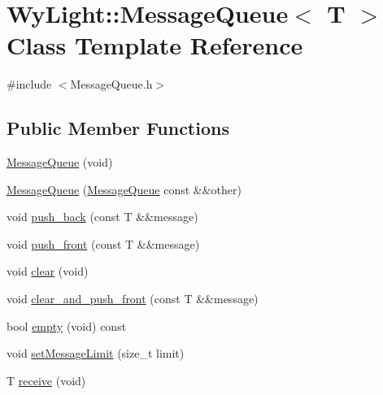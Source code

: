 \hypertarget{class_wy_light_1_1_message_queue}{\section{Wy\-Light\-:\-:Message\-Queue$<$ T $>$ Class Template Reference}
\label{class_wy_light_1_1_message_queue}
}


{\ttfamily \#include $<$Message\-Queue.\-h$>$}

\subsection*{Public Member Functions}
\begin{DoxyCompactItemize}
\item 
\hyperlink{class_wy_light_1_1_message_queue_aa116745b3c6a257e7a8149432b1ae612}{Message\-Queue} (void)
\item 
\hyperlink{class_wy_light_1_1_message_queue_a92bf2e25bbd0feceabb3bf21368a4696}{Message\-Queue} (\hyperlink{class_wy_light_1_1_message_queue}{Message\-Queue} const \&\&other)
\item 
void \hyperlink{class_wy_light_1_1_message_queue_abb19b5612cabae621cffbb85b11acbce}{push\-\_\-back} (const T \&\&message)
\item 
void \hyperlink{class_wy_light_1_1_message_queue_a70d00934df73199dafe469dcd2aa750c}{push\-\_\-front} (const T \&\&message)
\item 
void \hyperlink{class_wy_light_1_1_message_queue_a07807ffc11826fb293b95f56fa2a6952}{clear} (void)
\item 
void \hyperlink{class_wy_light_1_1_message_queue_afa0cc613fbaf294bab1834b97d159de8}{clear\-\_\-and\-\_\-push\-\_\-front} (const T \&\&message)
\item 
bool \hyperlink{class_wy_light_1_1_message_queue_a2195f869b08d83342ac21353aa510161}{empty} (void) const 
\item 
void \hyperlink{class_wy_light_1_1_message_queue_ad7293e8940ef5c4cb34e62bfd389e5bc}{set\-Message\-Limit} (size\-\_\-t limit)
\item 
T \hyperlink{class_wy_light_1_1_message_queue_a8d993b590e708be1c3bdfd30112bdaa6}{receive} (void)
\end{DoxyCompactItemize}


